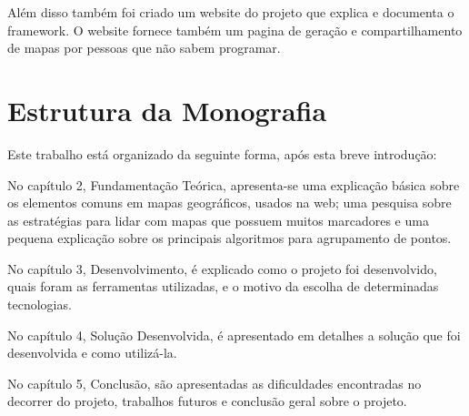 Além disso também foi criado um website do projeto \cite{gitsite} que explica e documenta o framework. O website fornece também um pagina de geração e compartilhamento de mapas por pessoas que não sabem programar.

\section{Estrutura da Monografia}
Este trabalho está organizado da seguinte forma, após esta breve introdução:

No capítulo 2, Fundamentação Teórica, apresenta-se uma explicação básica sobre os elementos comuns em mapas geográficos, usados na web; uma pesquisa sobre as estratégias para lidar com mapas que possuem muitos marcadores e uma pequena explicação sobre os principais algoritmos para agrupamento de pontos.

No capítulo 3, Desenvolvimento, é explicado como o projeto foi desenvolvido, quais foram as ferramentas utilizadas, e o motivo da escolha de determinadas tecnologias. 

No capítulo 4, Solução Desenvolvida, é apresentado em detalhes a solução que foi desenvolvida e como utilizá-la.

No capítulo 5, Conclusão, são apresentadas as dificuldades encontradas no decorrer do projeto, trabalhos futuros e conclusão geral sobre o projeto.



